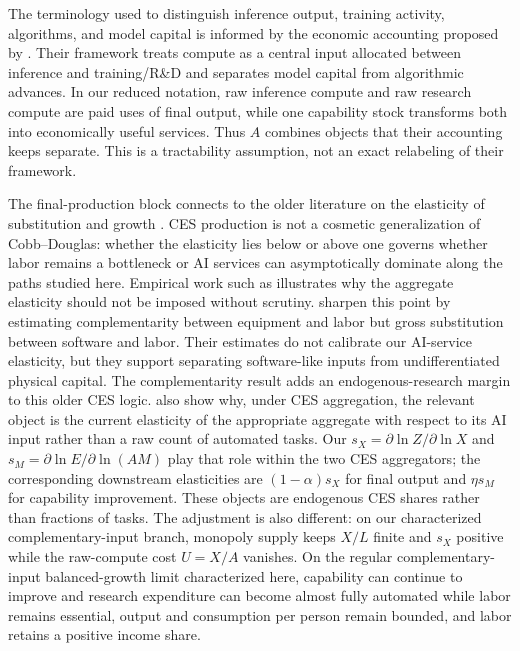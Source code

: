 The terminology used to distinguish inference output, training activity,
algorithms, and model capital is informed by the economic accounting proposed by
\citet{korinekmckelvey2026}. Their framework treats compute as a central input
allocated between inference and training/R\&D and separates model capital from
algorithmic advances. In our reduced notation, raw inference compute and raw
research compute are paid uses of final output, while one capability stock
transforms both into economically useful services. Thus \(A\) combines objects
that their accounting keeps separate. This is a tractability assumption, not an
exact relabeling of their framework.

The final-production block connects to the older literature on the elasticity of
substitution and growth \citep{pitchford1960,jonesmanuelli1990,rebelo1991}. CES
production is not a cosmetic generalization of Cobb--Douglas: whether the
elasticity lies below or above one governs whether labor remains a bottleneck or
AI services can asymptotically dominate along the paths studied here. Empirical work such as
\citet{duffypapageorgiou2000} illustrates why the aggregate elasticity should not
be imposed without scrutiny. \citet{aumshin2024} sharpen this point by estimating
complementarity between equipment and labor but gross substitution between
software and labor. Their estimates do not calibrate our AI-service elasticity,
but they support separating software-like inputs from undifferentiated physical
capital.
The complementarity result adds an endogenous-research margin to this older CES
logic. \citet{davidsonetal2026} also show why, under CES aggregation, the relevant
object is the current elasticity of the appropriate aggregate with respect to its
AI input rather than a raw count of automated tasks. Our \(s_X=\partial\ln
Z/\partial\ln X\) and \(s_M=\partial\ln E/\partial\ln(AM)\) play that role within
the two CES aggregators; the corresponding downstream elasticities are
\((1-\alpha)s_X\) for final output and \(\eta s_M\) for capability improvement.
These objects are endogenous CES shares rather than fractions of tasks. The adjustment is
also different: on our characterized complementary-input branch, monopoly supply
keeps \(X/L\) finite and \(s_X\) positive while the raw-compute cost \(U=X/A\)
vanishes. On the regular complementary-input balanced-growth limit characterized
here, capability can continue to improve and research expenditure can become
almost fully automated while labor remains essential, output and consumption per
person remain bounded, and labor retains a positive income share.

